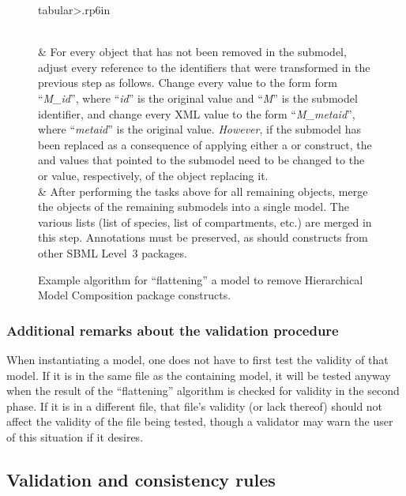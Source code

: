 \begin{figure}[thb]
\begin{edtable}{tabular}{>{\therownum.}rp{6in}}
\begin{enumerate}[label={\alph*})]
    \vspace*{-1em}
    \end{enumerate}
    \\
    & For every object that has not been removed in the submodel,
    adjust every reference to the identifiers that were transformed in
    the previous step as follows.  Change every  value
    to the form form ``\emph{M\_id}'', where ``\emph{id}'' is the
    original  value and ``\emph{M}'' is the submodel
    identifier, and change every XML  value to the form
    ``\emph{M\_metaid}'', where ``\emph{metaid}'' is the original
     value.  \emph{However}, if the submodel has been
    replaced as a consequence of applying either a \ReplacedElement or
    \ReplacedBy construct, the  and 
    values that pointed to the submodel need to be changed to the
     or  value, respectively, of the object
    replacing it.
    \\
    & After performing the tasks above for all remaining objects,
    merge the objects of the remaining submodels into a single model.
    The various lists (list of species, list of compartments, etc.) are
    merged in this step.  Annotations must be preserved, as should
    constructs from other SBML Level~3 packages.
    \\
    \bottomrule
  \end{edtable}
  \caption{Example algorithm for ``flattening'' a model to remove
    Hierarchical Model Composition package constructs.}
  \label{flattening-algo}
\end{figure}


\subsubsection{Additional remarks about the validation procedure}

When \notice instantiating a model, one does not have to first test the
validity of that model.  If it is in the same file as the containing
model, it will be tested anyway when the result of the ``flattening''
algorithm is checked for validity in the second phase.  If it is in a
different file, that file's validity (or lack thereof) should not affect
the validity of the file being tested, though a validator may warn the
user of this situation if it desires.


\subsection{Validation and consistency rules}
\label{validation-rules}

